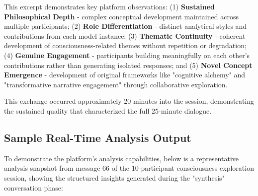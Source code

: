 \documentclass[11pt,letterpaper]{article}
\begin{document}
This excerpt demonstrates key platform observations: (1) \textbf{Sustained 
Philosophical Depth} - complex conceptual development maintained across 
multiple participants; (2) \textbf{Role Differentiation} - distinct analytical 
styles and contributions from each model instance; (3) \textbf{Thematic 
Continuity} - coherent development of consciousness-related themes without 
repetition or degradation; (4) \textbf{Genuine Engagement} - participants 
building meaningfully on each other's contributions rather than generating 
isolated responses; and (5) \textbf{Novel Concept Emergence} - development of 
original frameworks like "cognitive alchemy" and "transformative narrative 
engagement" through collaborative exploration.

This exchange occurred approximately 20 minutes into the session, demonstrating 
the sustained quality that characterized the full 25-minute dialogue.

\subsection{Sample Real-Time Analysis Output}

To demonstrate the platform's analysis capabilities, below is a representative analysis snapshot from message 66 of the 10-participant consciousness exploration session, showing the structured insights generated during the "synthesis" conversation phase:
\end{document}
